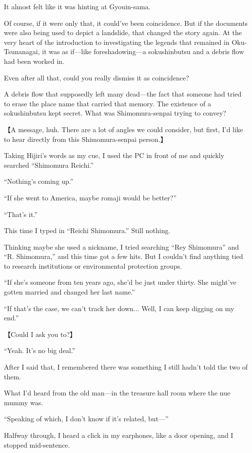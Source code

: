 \documentclass[
    a4paper,
    12pt,
    twoside,
    openany,
    UTF8,
    fontset=windows
]{ctexbook}
\begin{document}
It almost felt like it was hinting at Gyouin-sama.

Of course, if it were only that, it could've been coincidence. But if the documents were also being used to depict a landslide, that changed the story again. At the very heart of the introduction to investigating the legends that remained in Oku-Tsunanagai, it was as if---like foreshadowing---a sokushinbutsu and a debris flow had been worked in.

Even after all that, could you really dismiss it as coincidence?

A debris flow that supposedly left many dead---the fact that someone had tried to erase the place name that carried that memory. The existence of a sokushinbutsu kept secret. What was Shimomura-senpai trying to convey?

【A message, huh. There are a lot of angles we could consider, but first, I'd like to hear directly from this Shimomura-senpai person.】

Taking Hijiri's words as my cue, I used the PC in front of me and quickly searched ``Shimomura Reichi.''

``Nothing's coming up.''

``If she went to America, maybe romaji would be better?''

``That's it.''

This time I typed in ``Reichi Shimomura.'' Still nothing.

Thinking maybe she used a nickname, I tried searching ``Rey Shimomura'' and ``R. Shimomura,'' and this time got a few hits. But I couldn't find anything tied to research institutions or environmental protection groups.

``If she's someone from ten years ago, she'd be just under thirty. She might've gotten married and changed her last name.''

``If that's the case, we can't track her down... Well, I can keep digging on my end.''

【Could I ask you to?】

``Yeah. It's no big deal.''

After I said that, I remembered there was something I still hadn't told the two of them.

What I'd heard from the old man---in the treasure hall room where the nue mummy was.

``Speaking of which, I don't know if it's related, but---''

Halfway through, I heard a click in my earphones, like a door opening, and I stopped mid-sentence.
\end{document}
